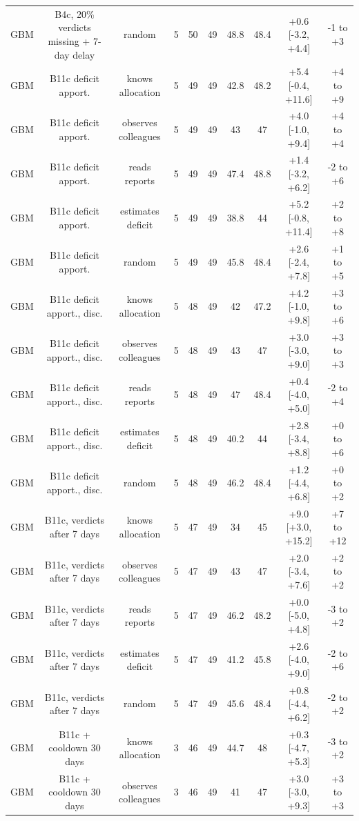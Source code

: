 \documentclass[10pt,onecolumn,letterpaper]{article}
\begin{document}
\begin{table}[!t]
{\begin{tabular}{lccccccccc}
GBM & B4c, 20\% verdicts missing + 7-day delay & random & 5 & 50 & 49 & 48.8 & 48.4 & +0.6 [-3.2, +4.4] & -1 to +3 \\
GBM & B11c deficit apport. & knows allocation & 5 & 49 & 49 & 42.8 & 48.2 & +5.4 [-0.4, +11.6] & +4 to +9 \\
GBM & B11c deficit apport. & observes colleagues & 5 & 49 & 49 & 43 & 47 & +4.0 [-1.0, +9.4] & +4 to +4 \\
GBM & B11c deficit apport. & reads reports & 5 & 49 & 49 & 47.4 & 48.8 & +1.4 [-3.2, +6.2] & -2 to +6 \\
GBM & B11c deficit apport. & estimates deficit & 5 & 49 & 49 & 38.8 & 44 & +5.2 [-0.8, +11.4] & +2 to +8 \\
GBM & B11c deficit apport. & random & 5 & 49 & 49 & 45.8 & 48.4 & +2.6 [-2.4, +7.8] & +1 to +5 \\
GBM & B11c deficit apport., disc. & knows allocation & 5 & 48 & 49 & 42 & 47.2 & +4.2 [-1.0, +9.8] & +3 to +6 \\
GBM & B11c deficit apport., disc. & observes colleagues & 5 & 48 & 49 & 43 & 47 & +3.0 [-3.0, +9.0] & +3 to +3 \\
GBM & B11c deficit apport., disc. & reads reports & 5 & 48 & 49 & 47 & 48.4 & +0.4 [-4.0, +5.0] & -2 to +4 \\
GBM & B11c deficit apport., disc. & estimates deficit & 5 & 48 & 49 & 40.2 & 44 & +2.8 [-3.4, +8.8] & +0 to +6 \\
GBM & B11c deficit apport., disc. & random & 5 & 48 & 49 & 46.2 & 48.4 & +1.2 [-4.4, +6.8] & +0 to +2 \\
GBM & B11c, verdicts after 7 days & knows allocation & 5 & 47 & 49 & 34 & 45 & +9.0 [+3.0, +15.2] & +7 to +12 \\
GBM & B11c, verdicts after 7 days & observes colleagues & 5 & 47 & 49 & 43 & 47 & +2.0 [-3.4, +7.6] & +2 to +2 \\
GBM & B11c, verdicts after 7 days & reads reports & 5 & 47 & 49 & 46.2 & 48.2 & +0.0 [-5.0, +4.8] & -3 to +2 \\
GBM & B11c, verdicts after 7 days & estimates deficit & 5 & 47 & 49 & 41.2 & 45.8 & +2.6 [-4.0, +9.0] & -2 to +6 \\
GBM & B11c, verdicts after 7 days & random & 5 & 47 & 49 & 45.6 & 48.4 & +0.8 [-4.4, +6.2] & -2 to +2 \\
GBM & B11c + cooldown 30 days & knows allocation & 3 & 46 & 49 & 44.7 & 48 & +0.3 [-4.7, +5.3] & -3 to +2 \\
GBM & B11c + cooldown 30 days & observes colleagues & 3 & 46 & 49 & 41 & 47 & +3.0 [-3.0, +9.3] & +3 to +3 \\

\end{tabular}}
\end{table}
\end{document}
